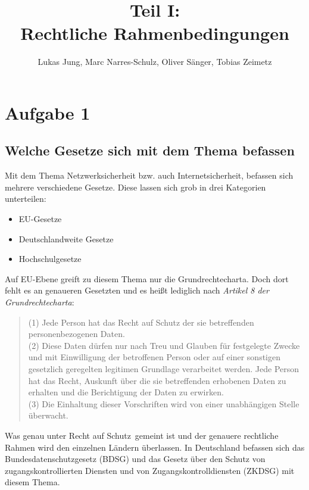 \documentclass[10pt,a4paper]{article}
\author{Lukas Jung, Marc Narres-Schulz, Oliver Sänger, Tobias Zeimetz}
\title{Teil I: \\Rechtliche Rahmenbedingungen}
\begin{document}
\maketitle
\newpage

\section*{Aufgabe 1}
\subsection*{Welche Gesetze sich mit dem Thema befassen}
Mit dem Thema Netzwerksicherheit bzw. auch Internetsicherheit, befassen sich mehrere verschiedene Gesetze. Diese lassen sich grob in drei Kategorien unterteilen:
\begin{itemize}
	\item EU-Gesetze
	\item Deutschlandweite Gesetze
	\item Hochschulgesetze
\end{itemize}
Auf EU-Ebene greift zu diesem Thema nur die Grundrechtecharta. Doch dort fehlt es an genaueren Gesetzten und es heißt lediglich nach \emph{Artikel 8 der Grundrechtecharta}:
\begin{quote}
(1) Jede Person hat das Recht auf Schutz der sie betreffenden personenbezogenen Daten.\\
(2) Diese Daten dürfen nur nach Treu und Glauben für festgelegte Zwecke und mit Einwilligung
der betroffenen Person oder auf einer sonstigen gesetzlich geregelten legitimen Grundlage verarbeitet
werden. Jede Person hat das Recht, Auskunft über die sie betreffenden erhobenen Daten zu erhalten
und die Berichtigung der Daten zu erwirken.\\
(3) Die Einhaltung dieser Vorschriften wird von einer unabhängigen Stelle überwacht.
\end{quote} 
Was genau unter \glqq Recht auf Schutz\grqq \ gemeint ist und der genauere rechtliche Rahmen wird den einzelnen Ländern überlassen. In Deutschland befassen sich das Bundesdatenschutzgesetz (BDSG) und das Gesetz über den Schutz von zugangskontrollierten Diensten und von Zugangskontrolldiensten (ZKDSG) mit diesem Thema. 
\end{document}
